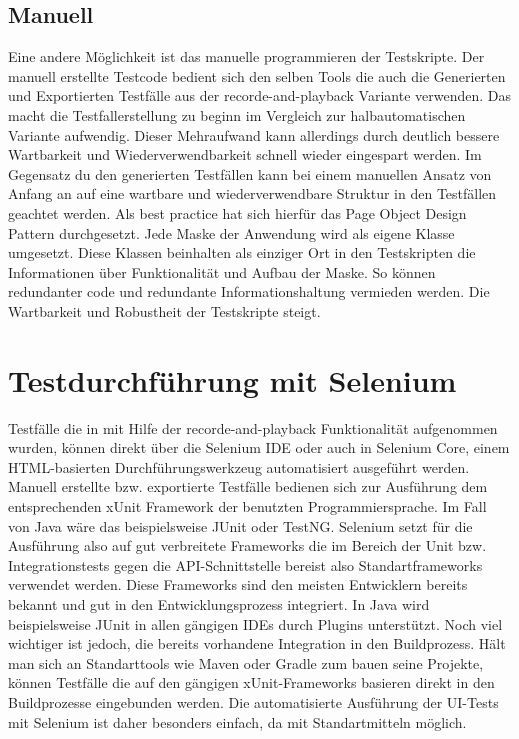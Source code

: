 \subsection{Manuell}
\label{sec:manuell}
Eine andere Möglichkeit ist das manuelle programmieren der Testskripte. Der manuell erstellte Testcode bedient sich den selben Tools die auch die Generierten und Exportierten Testfälle aus der recorde-and-playback Variante verwenden. Das macht die Testfallerstellung zu beginn im Vergleich zur halbautomatischen Variante aufwendig. Dieser Mehraufwand kann allerdings durch deutlich bessere Wartbarkeit und Wiederverwendbarkeit schnell wieder eingespart werden. Im Gegensatz du den generierten Testfällen kann bei einem manuellen Ansatz von Anfang an auf eine wartbare und wiederverwendbare Struktur in den Testfällen geachtet werden. Als best practice hat sich hierfür das Page Object Design Pattern \cite{selenium_test_????} durchgesetzt. Jede Maske der Anwendung wird als eigene Klasse umgesetzt. Diese Klassen beinhalten als einziger Ort in den Testskripten die Informationen über Funktionalität und Aufbau der Maske. So können redundanter code und redundante Informationshaltung vermieden werden. Die Wartbarkeit und Robustheit der Testskripte steigt.


\section{Testdurchführung mit Selenium}
\label{sec:testdurchführung_mit_selenium}

Testfälle die in mit Hilfe der recorde-and-playback Funktionalität aufgenommen wurden, können direkt über die Selenium IDE oder auch in Selenium Core, einem HTML-basierten Durchführungswerkzeug automatisiert ausgeführt werden. 
Manuell erstellte bzw. exportierte Testfälle bedienen sich zur Ausführung dem entsprechenden xUnit Framework der benutzten Programmiersprache. Im Fall von Java wäre das beispielsweise JUnit oder TestNG. Selenium setzt für die Ausführung also auf gut verbreitete Frameworks die im Bereich der Unit bzw. Integrationstests gegen die API-Schnittstelle bereist also Standartframeworks verwendet werden. Diese Frameworks sind den meisten Entwicklern bereits bekannt und gut in den Entwicklungsprozess integriert. In Java wird beispielsweise JUnit in allen gängigen IDEs durch Plugins unterstützt. Noch viel wichtiger ist jedoch, die bereits vorhandene Integration in den Buildprozess.
Hält man sich an Standarttools wie Maven oder Gradle zum bauen seine Projekte, können Testfälle die auf den gängigen xUnit-Frameworks basieren direkt in den Buildprozesse eingebunden werden.
Die automatisierte Ausführung der UI-Tests mit Selenium ist daher besonders einfach, da mit Standartmitteln möglich.

